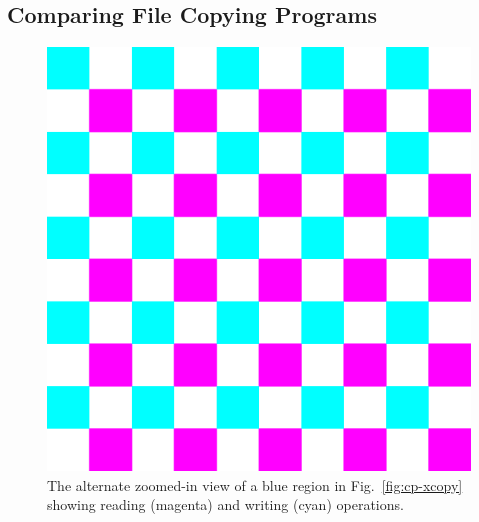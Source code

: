 \subsection{Comparing File Copying Programs}
\label{sec:cp}



\begin{figure}[htb]
\begin{center}
\includegraphics[width=0.10\columnwidth]{lviz/cp-zoom.png}
\caption{The alternate zoomed-in view of a blue region in
Fig.~\ref{fig:cp-xcopy} showing reading (magenta) and writing (cyan) operations.
}
\label{fig:cp-zoom}
\end{center}
\end{figure}

